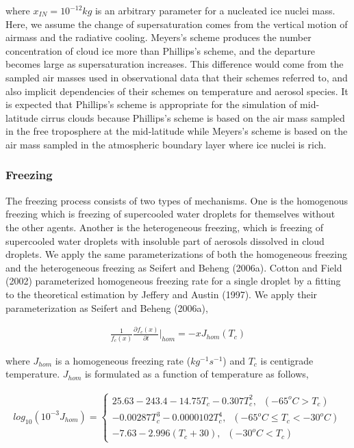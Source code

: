 where $x_{IN} = 10^{-12} kg$ is an arbitrary parameter for a nucleated ice nuclei mass. Here, we assume the change of supersaturation comes from the vertical motion of airmass and the radiative cooling. Meyers’s scheme produces the number concentration of cloud ice more than Phillips’s scheme, and the departure becomes large as supersaturation increases. This difference would come from the sampled air masses used in observational data that their schemes referred to, and also implicit dependencies of their schemes on temperature and aerosol species. It is expected that Phillips’s scheme is appropriate for the simulation of mid-latitude cirrus clouds because Phillips’s scheme is based on the air mass sampled in the free troposphere at the mid-latitude while Meyers’s scheme is based on the air mass sampled in the atmospheric boundary layer where ice nuclei is rich.

\subsubsection{Freezing}
The freezing process consists of two types of mechanisms. One is the homogenous freezing which is freezing of supercooled water droplets for themselves without the other agents. Another is the heterogeneous freezing, which is freezing of supercooled water droplets with insoluble part of aerosols dissolved in cloud droplets. We apply the same parameterizations of both the homogeneous freezing and the heterogeneous freezing as Seifert and Beheng (2006a). Cotton and Field (2002) parameterized homogeneous freezing rate for a single droplet by a fitting to the theoretical estimation by Jeffery and Austin (1997). We apply their parameterization as Seifert and Beheng (2006a),

\begin{eqnarray}
\frac{1}{f_{c}(x)}\frac{\partial f_{c}(x)}{\partial t}\Bigr|_{hom}=-xJ_{hom}(T_{c})\label{sn120}
\end{eqnarray}

where $J_{hom}$ is a homogeneous freezing rate ($kg^{-1}s^{-1}$) and $T_{c}$ is centigrade temperature. $J_{hom}$ is formulated as a function of temperature as follows,

\begin{eqnarray}
log_{10}(10^{-3}J_{hom})=
\left\{
\begin{array}{l}
25.63-243.4-14.75T_{c}-0.307T_{c}^{2},\;\;(-65^{o}C>T_{c}) \nonumber \\
-0.00287T_{c}^{3}-0.0000102T_{c}^{4},\;\;(-65^{o}C\leq T_{c}<-30^{o}C)\nonumber \\
-7.63-2.996(T_{c}+30),\;\;(-30^{o}C< T_{c})\nonumber
\end{array}
\label{sn121}
\right.
\end{eqnarray}

